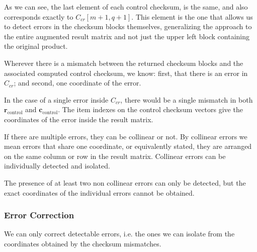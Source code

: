 As we can see, the last element of each control checksum, is the same,
and also corresponds exactly to $C_{cr}\left[m+1,q+1\right]$.
This element is the one that allows us to detect errors
in the checksum blocks themselves, generalizing the approach to the entire
augmented result matrix and not just the upper left block containing the original product.

Wherever there is a mismatch between the returned checksum blocks and the associated computed control checksum,
we know: first, that there is an error in $C_{cr}$; and second, one coordinate of the error.

In the case of a single error inside $C_{cr}$,
there would be a single mismatch in both
$\mathbf{r}_{\text{control}}$ and $\mathbf{c}_{\text{control}}$.
The item indexes on the control checksum vectors
give the coordinates of the error inside the result matrix.

If there are multiple errors, they can be collinear or not.
By collinear errors we mean errors that share one coordinate,
or equivalently stated,
they are arranged on the same column or row in the result matrix.
Collinear errors can be individually detected and isolated.

The presence of at least two non collinear errors
can only be detected, but the exact coordinates of the individual errors
cannot be obtained.




\subsubsection{Error Correction}

We can only correct detectable errors, i.e. the ones we can isolate from the coordinates obtained by the checksum mismatches.

